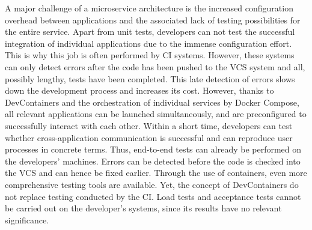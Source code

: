        A major challenge of a microservice architecture is the increased configuration overhead between applications and the associated lack of testing possibilities for the entire service. Apart from unit tests, developers can not test the successful integration of individual applications due to the immense configuration effort. This is why this job is often performed by \ac{CI} systems. However, these systems can only detect errors after the code has been pushed to the \ac{VCS} system and all, possibly lengthy, tests have been completed. This late detection of errors slows down the development process and increases its cost.\newline
        However, thanks to DevContainers and the orchestration of individual services by Docker Compose, all relevant applications can be launched simultaneously, and are preconfigured to successfully interact with each other. Within a short time, developers can test whether cross-application communication is successful and can reproduce user processes in concrete terms. Thus, end-to-end tests can already be performed on the developers' machines. Errors can be detected before the code is checked into the \ac{VCS} and can hence be fixed earlier. Through the use of containers, even more comprehensive testing tools are available.\newline
        Yet, the concept of DevContainers do not replace testing conducted by the \ac{CI}. Load tests and acceptance tests cannot be carried out on the developer's systems, since its results have no relevant significance.

